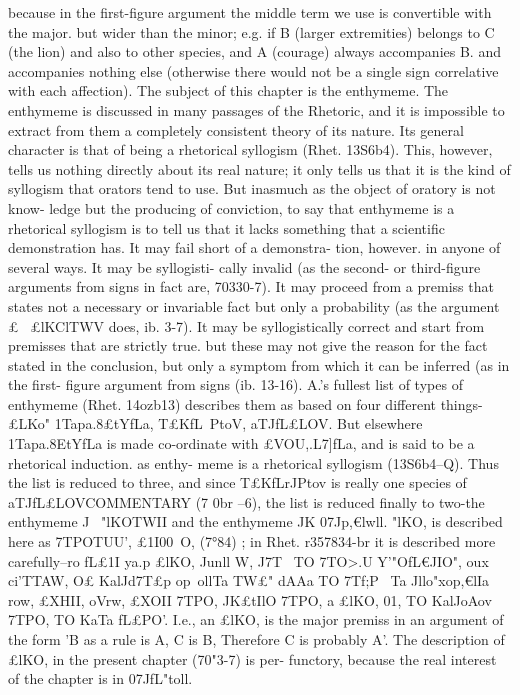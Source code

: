 {{{{{{{{{{{{{{{{{{{{{{{{{{{{{because in the first-figure argument the middle term we use is
convertible with the major. but wider than the minor; e.g. if B
(larger extremities) belongs to C (the lion) and also to other
species, and A (courage) always accompanies B. and accompanies
nothing else (otherwise there would not be a single sign correlative
with each affection).
The subject of this chapter is the enthymeme. The enthymeme
is discussed in many passages of the Rhetoric, and it is impossible
to extract from them a completely consistent theory of its nature.
Its general character is that of being a rhetorical syllogism (Rhet.
13S6b4). This, however, tells us nothing directly about its real
nature; it only tells us that it is the kind of syllogism that orators
tend to use. But inasmuch as the object of oratory is not know-
ledge but the producing of conviction, to say that enthymeme is
a rhetorical syllogism is to tell us that it lacks something that a
scientific demonstration has. It may fail short of a demonstra-
tion, however. in anyone of several ways. It may be syllogisti-
cally invalid (as the second- or third-figure arguments from signs
in fact are, 70330-7). It may proceed from a premiss that states
not a necessary or invariable fact but only a probability (as the
argument £~ £lKClTWV does, ib. 3-7). It may be syllogistically
correct and start from premisses that are strictly true. but these
may not give the reason for the fact stated in the conclusion, but
only a symptom from which it can be inferred (as in the first-
figure argument from signs (ib. 13-16).
A.'s fullest list of types of enthymeme (Rhet. 14ozb13) describes
them as based on four different things-£LKo" 1Tapa.8£tYfLa,
T£KfL~PtoV, aTJfL£LOV. But elsewhere 1Tapa.8EtYfLa is made co-ordinate
with £VOU,.L7]fLa, and is said to be a rhetorical induction. as enthy-
meme is a rhetorical syllogism (13S6b4--Q). Thus the list is reduced
to three, and since T£KfLrJPtov is really one species of aTJfL£LOVCOMMENTARY
(7 0br --6), the list is reduced finally to two-the enthymeme
J~ "lKOTWII and the enthymeme JK 07Jp,€lwll. "lKO, is described here
as 7TPOTUU', £1I00~O, (7°84) ; in Rhet. r357834-br it is described more
carefully--ro fL£1I ya.p £lKO, Junll W, J7T~ TO 7TO>.U Y'"OfL€JIO", oux
ci'TTAW, O£ KalJd7T£p op{~ollTa{ TW£" dAAa TO 7Tf;P~ Ta Jllo"xop,€lIa row,
£XHII, oVrw, £XOII 7TPO, JK£tIlO 7TPO, a £lKO, 01, TO KalJoAov 7TPO, TO
KaTa fL£PO'. I.e., an £lKO, is the major premiss in an argument of
the form 'B as a rule is A, C is B, Therefore C is probably A'.
The description of £lKO, in the present chapter (70"3-7) is per-
functory, because the real interest of the chapter is in 07JfL"toll.
}}}}}}}}}}}}}}}}}}}}}}}}}}}}}}}
